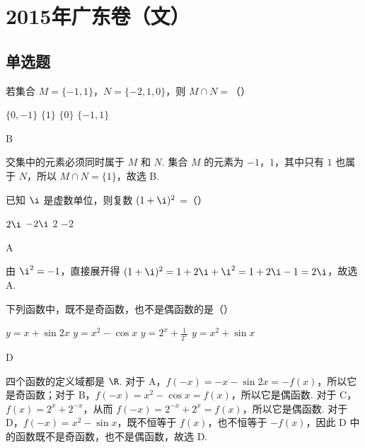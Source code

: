 \chapter{2015年广东卷（文）}

\section{单选题}

\begin{problem}
若集合 \(M = \{-1, 1\}\)，\(N = \{-2, 1, 0\}\)，则 \(M \cap N =\)（\quad）

\choices
    {\(\{0, -1\}\)}
    {\(\{1\}\)}
    {\(\{0\}\)}
    {\(\{-1, 1\}\)}
\end{problem}

\begin{answer}
B
\end{answer}

\begin{solution}
交集中的元素必须同时属于 \(M\) 和 \(N\). 集合 \(M\) 的元素为 \(-1\)，\(1\)，其中只有 \(1\) 也属于 \(N\)，所以 \(M\cap N=\{1\}\)，故选 B.
\end{solution}

\begin{problem}
已知 \(\i\) 是虚数单位，则复数 \((1 + \i)^{2}\) =（\quad）

\choices
    {\(2\i\)}
    {\(-2\i\)}
    {\(2\)}
    {\(-2\)}
\end{problem}

\begin{answer}
A
\end{answer}

\begin{solution}
由 \(\i^2=-1\)，直接展开得 \((1+\i)^2=1+2\i+\i^2=1+2\i-1=2\i\)，故选 A.
\end{solution}

\begin{problem}
下列函数中，既不是奇函数，也不是偶函数的是（\quad）

\choices
    {\(y = x + \sin 2x\)}
    {\(y = x^{2} - \cos x\)}
    {\(y = 2^{x} + \frac{1}{2^{x}}\)}
    {\(y = x^{2} + \sin x\)}
\end{problem}

\begin{answer}
D
\end{answer}

\begin{solution}
四个函数的定义域都是 \(\R\). 对于 A，\(f(-x)=-x-\sin 2x=-f(x)\)，所以它是奇函数；对于 B，\(f(-x)=x^2-\cos x=f(x)\)，所以它是偶函数. 对于 C，\(f(x)=2^x+2^{-x}\)，从而 \(f(-x)=2^{-x}+2^x=f(x)\)，所以它是偶函数. 对于 D，\(f(-x)=x^2-\sin x\)，既不恒等于 \(f(x)\)，也不恒等于 \(-f(x)\)，因此 D 中的函数既不是奇函数，也不是偶函数，故选 D.
\end{solution}

